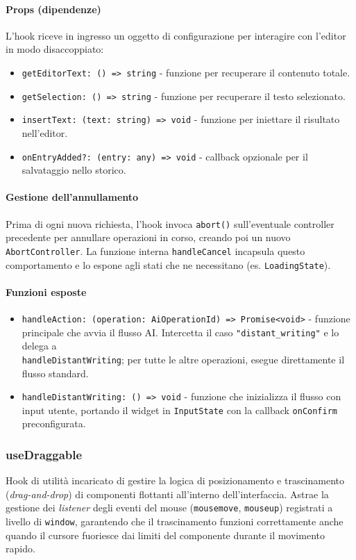 \documentclass[11pt,a4paper]{article}
\begin{document}
\paragraph{Props (dipendenze)}
L'hook riceve in ingresso un oggetto di configurazione per interagire con l'editor in modo disaccoppiato:
\begin{itemize}
    \item \texttt{getEditorText: () => string} - funzione per recuperare il contenuto totale.
    \item \texttt{getSelection: () => string} - funzione per recuperare il testo selezionato.
    \item \texttt{insertText: (text: string) => void} - funzione per iniettare il risultato nell'editor.
    \item \texttt{onEntryAdded?: (entry: any) => void} - callback opzionale per il salvataggio nello storico.
\end{itemize}

\paragraph{Gestione dell'annullamento}
Prima di ogni nuova richiesta, l'hook invoca \texttt{abort()} sull'eventuale controller precedente per annullare operazioni in corso, creando poi un nuovo \texttt{AbortController}. La funzione interna \texttt{handleCancel} incapsula questo comportamento e lo espone agli stati che ne necessitano (es. \texttt{LoadingState}).

\paragraph{Funzioni esposte}
\begin{itemize}
    \item \texttt{handleAction: (operation: AiOperationId) => Promise<void>} - funzione principale che avvia il flusso AI. Intercetta il caso \texttt{"distant\_writing"} e lo delega a \\ \texttt{handleDistantWriting}; per tutte le altre operazioni, esegue direttamente il flusso standard.
    \item \texttt{handleDistantWriting: () => void} - funzione che inizializza il flusso con input utente, portando il widget in \texttt{InputState} con la callback \texttt{onConfirm} preconfigurata.
\end{itemize}

\subsubsection{useDraggable}
Hook di utilità incaricato di gestire la logica di posizionamento e trascinamento (\textit{drag-and-drop}) di componenti flottanti all'interno dell'interfaccia. Astrae la gestione dei \textit{listener} degli eventi del mouse (\texttt{mousemove}, \texttt{mouseup}) registrati a livello di \texttt{window}, garantendo che il trascinamento funzioni correttamente anche quando il cursore fuoriesce dai limiti del componente durante il movimento rapido.
\end{document}
